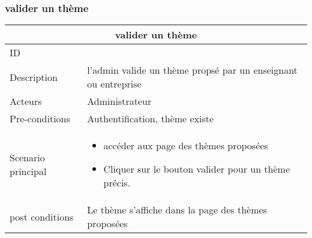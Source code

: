 \documentclass[11pt,fleqn]{book} %
\begin{document}
\subsubsection{valider un thème}
\begin{center}
\begin{tabularx}{1\textwidth} { | p{4cm} | >{\raggedright\arraybackslash}X |  }
  \hline
  \multicolumn{2}{|c|}{valider un thème} \\
 \hline
 ID & 2  \\
 \hline
 Description  &   l'admin valide un thème propsé par un enseignant ou entreprise \\
  \hline
 Acteurs  & Administrateur   \\
  \hline
 Pre-conditions  & Authentification, thème existe\\
 \hline
 Scenario principal  &  
 \begin{itemize}
     \item accéder aux page des thèmes proposées
     \item Cliquer sur le bouton valider pour un thème précis.
 \end{itemize}\\
  \hline
 post conditions  &   Le thème s'affiche dans la page des thèmes proposées  \\
  \hline
\end{tabularx}
\label{tbl:nicetablelesstable}
\end{center}
\end{document}

